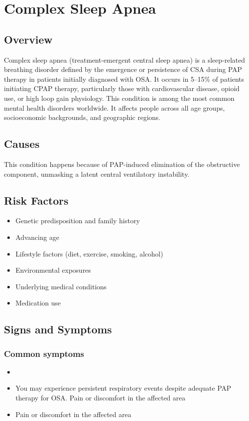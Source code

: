 \chapter{Complex Sleep Apnea}
\label{sec:Complex Sleep Apnea}

\section{Overview}
Complex sleep apnea (treatment-emergent central sleep apnea) is a sleep-related breathing disorder defined by the emergence or persistence of CSA during PAP therapy in patients initially diagnosed with OSA. It occurs in 5--15\% of patients initiating CPAP therapy, particularly those with cardiovascular disease, opioid use, or high loop gain physiology. This condition is among the most common mental health disorders worldwide. It affects people across all age groups, socioeconomic backgrounds, and geographic regions.
\section{Causes}
This condition happens because of PAP-induced elimination of the obstructive component, unmasking a latent central ventilatory instability.     
\section{Risk Factors}

\begin{itemize}[noitemsep]
  \item Genetic predisposition and family history
  \item Advancing age
  \item Lifestyle factors (diet, exercise, smoking, alcohol)
  \item Environmental exposures
  \item Underlying medical conditions
  \item Medication use
\end{itemize}
\section{Signs and Symptoms}

\subsection{Common symptoms}
\begin{itemize}[noitemsep]
  \item \item You may experience persistent respiratory events despite adequate PAP therapy for OSA. Pain or discomfort in the affected area    \item Pain or discomfort in the affected area
  \end{itemize}

